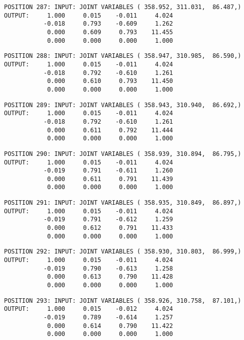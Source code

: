 \begin{verbatim}
POSITION 287: INPUT: JOINT VARIABLES ( 358.952, 311.031,  86.487,)
OUTPUT:     1.000     0.015    -0.011     4.024
           -0.018     0.793    -0.609     1.262
            0.000     0.609     0.793    11.455
            0.000     0.000     0.000     1.000
\end{verbatim} \pagebreak[1]\begin{verbatim}
POSITION 288: INPUT: JOINT VARIABLES ( 358.947, 310.985,  86.590,)
OUTPUT:     1.000     0.015    -0.011     4.024
           -0.018     0.792    -0.610     1.261
            0.000     0.610     0.793    11.450
            0.000     0.000     0.000     1.000
\end{verbatim} \pagebreak[1]\begin{verbatim}
POSITION 289: INPUT: JOINT VARIABLES ( 358.943, 310.940,  86.692,)
OUTPUT:     1.000     0.015    -0.011     4.024
           -0.018     0.792    -0.610     1.261
            0.000     0.611     0.792    11.444
            0.000     0.000     0.000     1.000
\end{verbatim} \pagebreak[1]\begin{verbatim}
POSITION 290: INPUT: JOINT VARIABLES ( 358.939, 310.894,  86.795,)
OUTPUT:     1.000     0.015    -0.011     4.024
           -0.019     0.791    -0.611     1.260
            0.000     0.611     0.791    11.439
            0.000     0.000     0.000     1.000
\end{verbatim} \pagebreak[1]\begin{verbatim}
POSITION 291: INPUT: JOINT VARIABLES ( 358.935, 310.849,  86.897,)
OUTPUT:     1.000     0.015    -0.011     4.024
           -0.019     0.791    -0.612     1.259
            0.000     0.612     0.791    11.433
            0.000     0.000     0.000     1.000
\end{verbatim} \pagebreak[1]\begin{verbatim}
POSITION 292: INPUT: JOINT VARIABLES ( 358.930, 310.803,  86.999,)
OUTPUT:     1.000     0.015    -0.011     4.024
           -0.019     0.790    -0.613     1.258
            0.000     0.613     0.790    11.428
            0.000     0.000     0.000     1.000
\end{verbatim} \pagebreak[1]\begin{verbatim}
POSITION 293: INPUT: JOINT VARIABLES ( 358.926, 310.758,  87.101,)
OUTPUT:     1.000     0.015    -0.012     4.024
           -0.019     0.789    -0.614     1.257
            0.000     0.614     0.790    11.422
            0.000     0.000     0.000     1.000
\end{verbatim} \pagebreak[1]\begin{verbatim}

\end{verbatim}
